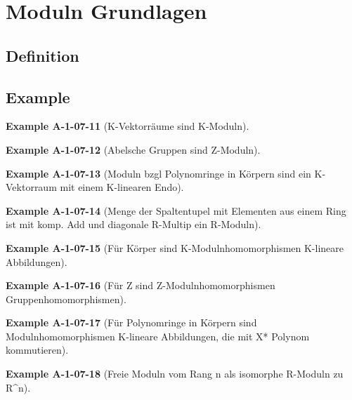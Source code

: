 \documentclass[10pt, letterpaper]{article}
\newcommand{\CustomHeading}[3]{%
  \par\medskip\noindent%
  \textbf{#1 #2} \textnormal{(#3)}.\enskip%
}
\newenvironment{EXA}[2]{\CustomHeading{Example}{#1}{#2}}{}
\begin{document}
\section{Moduln Grundlagen}

\subsection{Definition}

\subsection{Example}



\begin{EXA}{A-1-07-11}{K-Vektorräume sind K-Moduln}

\end{EXA}

\begin{EXA}{A-1-07-12}{Abelsche Gruppen sind Z-Moduln}

\end{EXA}

\begin{EXA}{A-1-07-13}{Moduln bzgl Polynomringe in Körpern sind ein K-Vektorraum mit einem K-linearen Endo}

\end{EXA}

\begin{EXA}{A-1-07-14}{Menge der Spaltentupel mit Elementen aus einem Ring ist mit komp. Add und diagonale R-Multip ein R-Moduln}

\end{EXA}

\begin{EXA}{A-1-07-15}{Für Körper sind K-Modulnhomomorphismen K-lineare Abbildungen}

\end{EXA}

\begin{EXA}{A-1-07-16}{Für Z sind Z-Modulnhomomorphismen Gruppenhomomorphismen}

\end{EXA}

\begin{EXA}{A-1-07-17}{Für Polynomringe in Körpern sind Modulnhomomorphismen K-lineare Abbildungen, die mit X* Polynom kommutieren}

\end{EXA}

\begin{EXA}{A-1-07-18}{Freie Moduln vom Rang n als isomorphe R-Moduln zu R^n}

\end{EXA}
\end{document}
